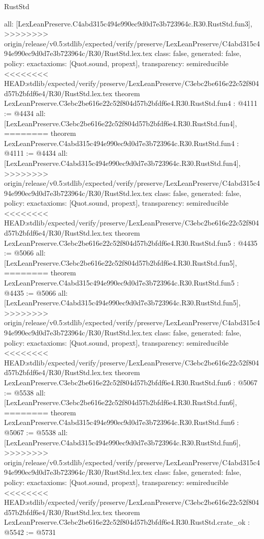 \begin{lexlean}{RustStd}
\begin{coremodule}
{\begin{coremodule}
{{{{{{{  all: [LexLeanPreserve.C4abd315c494e990ec9d0d7e3b723964c.R30.RustStd.fun3],
>>>>>>>> origin/release/v0.5:stdlib/expected/verify/preserve/LexLeanPreserve/C4abd315c494e990ec9d0d7e3b723964c/R30/RustStd.lex.tex
  class: false,
  generated: false,
  policy: exact{axioms: [Quot.sound, propext]},
  transparency: semireducible
}
<<<<<<<< HEAD:stdlib/expected/verify/preserve/LexLeanPreserve/C3ebc2be616e22c52f804d57b2bfdf6e4/R30/RustStd.lex.tex
theorem LexLeanPreserve.C3ebc2be616e22c52f804d57b2bfdf6e4.R30.RustStd.fun4 : @4111 := @4434 {
  all: [LexLeanPreserve.C3ebc2be616e22c52f804d57b2bfdf6e4.R30.RustStd.fun4],
========
theorem LexLeanPreserve.C4abd315c494e990ec9d0d7e3b723964c.R30.RustStd.fun4 : @4111 := @4434 {
  all: [LexLeanPreserve.C4abd315c494e990ec9d0d7e3b723964c.R30.RustStd.fun4],
>>>>>>>> origin/release/v0.5:stdlib/expected/verify/preserve/LexLeanPreserve/C4abd315c494e990ec9d0d7e3b723964c/R30/RustStd.lex.tex
  class: false,
  generated: false,
  policy: exact{axioms: [Quot.sound, propext]},
  transparency: semireducible
}
<<<<<<<< HEAD:stdlib/expected/verify/preserve/LexLeanPreserve/C3ebc2be616e22c52f804d57b2bfdf6e4/R30/RustStd.lex.tex
theorem LexLeanPreserve.C3ebc2be616e22c52f804d57b2bfdf6e4.R30.RustStd.fun5 : @4435 := @5066 {
  all: [LexLeanPreserve.C3ebc2be616e22c52f804d57b2bfdf6e4.R30.RustStd.fun5],
========
theorem LexLeanPreserve.C4abd315c494e990ec9d0d7e3b723964c.R30.RustStd.fun5 : @4435 := @5066 {
  all: [LexLeanPreserve.C4abd315c494e990ec9d0d7e3b723964c.R30.RustStd.fun5],
>>>>>>>> origin/release/v0.5:stdlib/expected/verify/preserve/LexLeanPreserve/C4abd315c494e990ec9d0d7e3b723964c/R30/RustStd.lex.tex
  class: false,
  generated: false,
  policy: exact{axioms: [Quot.sound, propext]},
  transparency: semireducible
}
<<<<<<<< HEAD:stdlib/expected/verify/preserve/LexLeanPreserve/C3ebc2be616e22c52f804d57b2bfdf6e4/R30/RustStd.lex.tex
theorem LexLeanPreserve.C3ebc2be616e22c52f804d57b2bfdf6e4.R30.RustStd.fun6 : @5067 := @5538 {
  all: [LexLeanPreserve.C3ebc2be616e22c52f804d57b2bfdf6e4.R30.RustStd.fun6],
========
theorem LexLeanPreserve.C4abd315c494e990ec9d0d7e3b723964c.R30.RustStd.fun6 : @5067 := @5538 {
  all: [LexLeanPreserve.C4abd315c494e990ec9d0d7e3b723964c.R30.RustStd.fun6],
>>>>>>>> origin/release/v0.5:stdlib/expected/verify/preserve/LexLeanPreserve/C4abd315c494e990ec9d0d7e3b723964c/R30/RustStd.lex.tex
  class: false,
  generated: false,
  policy: exact{axioms: [Quot.sound, propext]},
  transparency: semireducible
}
<<<<<<<< HEAD:stdlib/expected/verify/preserve/LexLeanPreserve/C3ebc2be616e22c52f804d57b2bfdf6e4/R30/RustStd.lex.tex
theorem LexLeanPreserve.C3ebc2be616e22c52f804d57b2bfdf6e4.R30.RustStd.crate_ok : @5542 := @5731 {
}}}}}}}}}}
\end{coremodule}}
\end{coremodule}
\end{lexlean}
